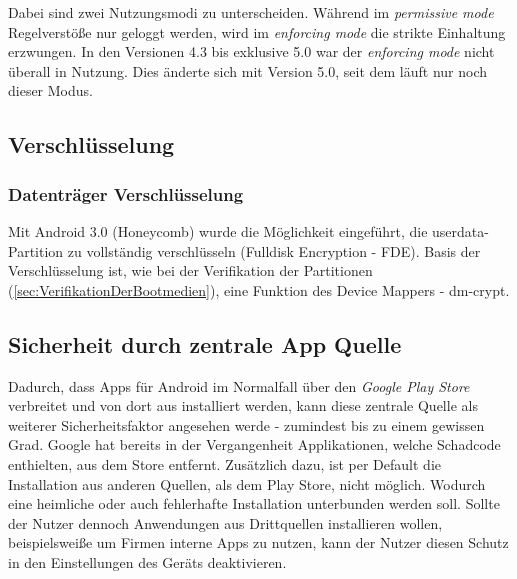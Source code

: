 	Dabei sind zwei Nutzungsmodi zu unterscheiden. Während im \textit{permissive mode} Regelverstöße nur geloggt werden, wird im \textit{enforcing mode} die strikte Einhaltung erzwungen. In den Versionen 4.3 bis exklusive 5.0 war der \textit{enforcing mode} nicht überall in Nutzung. Dies änderte sich mit Version 5.0, seit dem läuft nur noch dieser Modus.
	
	\subsection{Verschlüsselung}
	\subsubsection{Datenträger Verschlüsselung}
	Mit Android 3.0 (Honeycomb) wurde die Möglichkeit eingeführt, die userdata-Partition zu vollständig verschlüsseln (Fulldisk Encryption - FDE). Basis der Verschlüsselung ist, wie bei der Verifikation der Partitionen (\ref{sec:VerifikationDerBootmedien}), eine Funktion des Device Mappers - dm-crypt. %
	
	\subsection{Sicherheit durch zentrale App Quelle}
	Dadurch, dass Apps für Android im Normalfall über den \textit{Google Play Store} verbreitet und von dort aus installiert werden, kann diese zentrale Quelle als weiterer Sicherheitsfaktor angesehen werde - zumindest bis zu einem gewissen Grad. Google hat bereits in der Vergangenheit Applikationen, welche Schadcode enthielten, aus dem Store entfernt. Zusätzlich dazu, ist per Default die Installation aus anderen Quellen, als dem Play Store, nicht möglich. Wodurch eine heimliche oder auch fehlerhafte Installation unterbunden werden soll. Sollte der Nutzer dennoch Anwendungen aus Drittquellen installieren wollen, beispielsweiße um Firmen interne Apps zu nutzen, kann der Nutzer diesen Schutz in den Einstellungen des Geräts deaktivieren.
	